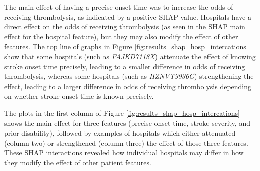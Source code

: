 The main effect of having a precise onset time was to increase the odds of receiving thrombolysis, as indicated by a positive SHAP value. Hospitals have a direct effect on the odds of receiving thrombolysis (as seen in the SHAP main effect for the hospital feature), but they may also modify the effect of other features. The top line of graphs in Figure \ref{fig:results_shap_hosp_intercations} show that some hospitals (such as \emph{FAJKD7118X}) attenuate the effect of knowing stroke onset time precisely, leading to a smaller difference in odds of receiving thrombolysis, whereas some hospitals (such as \emph{HZNVT9936G}) strengthening the effect, leading to a larger difference in odds of receiving thrombolysis depending on whether stroke onset time is known precisely.

The plots in the first column of Figure \ref{fig:results_shap_hosp_intercations} shows the main effect for three features (precise onset time, stroke severity, and prior disability), followed by examples of hospitals which either attenuated (column two) or strengthened (column three) the effect of those three features. These SHAP interactions revealed how individual hospitals may differ in how they modify the effect of other patient features.

